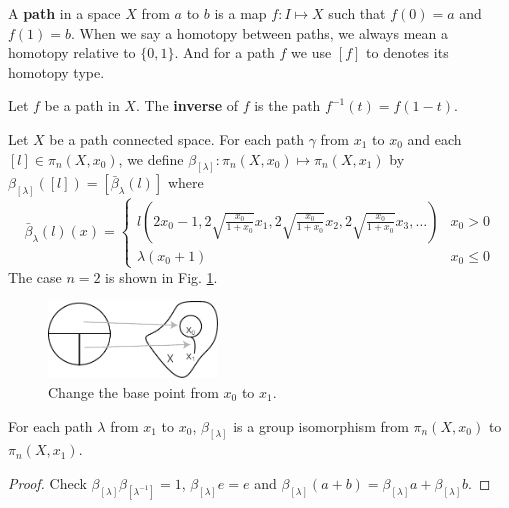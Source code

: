 \documentclass[12pt]{book}
\begin{document}
\begin{definition}
	A {\bf path} in a space $X$ from $a$ to $b$ is a map $f:I\mapsto X$ such that $f(0)=a$ and $f(1)=b$. When we say a homotopy between paths, we always mean a homotopy relative to $\{0,1\}$. And for a path $f$ we use $[f]$ to denotes its homotopy type.
\end{definition}

\begin{definition}
	Let $f$ be a path in $X$. The {\bf inverse} of $f$ is the path $f^{-1}(t)=f(1-t)$.
\end{definition}

\begin{definition}
	Let $X$ be a path connected space. For each path $\gamma$ from $x_1$ to $x_0$ and each $[l]\in\pi_n(X,x_0)$, we define $\beta_{[\lambda]}:\pi_n(X,x_0)\mapsto\pi_n(X,x_1)$ by $\beta_{[\lambda]}([l])=[\bar \beta_\lambda(l)]$ where
	\begin{equation}
		\bar \beta_\lambda(l)(x)=\left\{
		\begin{array}{cc}
			l(2x_0-1,2\sqrt{\frac{x_0}{1+x_0}}x_1,2\sqrt{\frac{x_0}{1+x_0}}x_2,2\sqrt{\frac{x_0}{1+x_0}}x_3,\dots)&x_0>0\\
			\lambda(x_0+1)&x_0\leq0
		\end{array}
		\right.
	\end{equation}
	The case $n=2$ is shown in Fig. \ref{fig:change_base}.
\end{definition}

\begin{figure}[htb!]
	\centering  
	\includegraphics[width=0.4\textwidth ]{resources/chap_bas_cstr/change_base.pdf}  
	\caption{Change the base point from $x_0$ to $x_1$.}
	\label{fig:change_base}
\end{figure}

\begin{lemma}
	For each path $\lambda$ from $x_1$ to $x_0$, $\beta_{[\lambda]}$ is a group isomorphism from $\pi_n(X,x_0)$ to $\pi_n(X,x_1)$.
\end{lemma}
\begin{proof}
	Check $\beta_{[\lambda]}\beta_{[\lambda^{-1}]}=1$, $\beta_{[\lambda]}e=e$ and $\beta_{[\lambda]}(a+b)=\beta_{[\lambda]}a+\beta_{[\lambda]}b$.
\end{proof}
\end{document}
